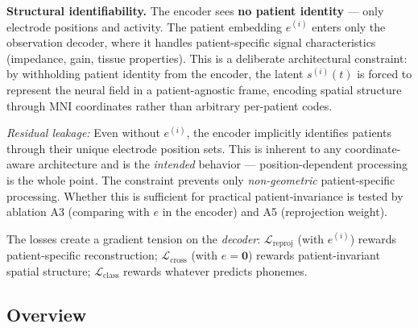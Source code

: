 \documentclass[11pt,letterpaper]{article}
\begin{document}
\textbf{Structural identifiability.} The encoder sees \textbf{no patient identity} --- only electrode positions and activity. The patient embedding $e^{(i)}$ enters only the observation decoder, where it handles patient-specific signal characteristics (impedance, gain, tissue properties). This is a deliberate architectural constraint: by withholding patient identity from the encoder, the latent $s^{(i)}(t)$ is forced to represent the neural field in a patient-agnostic frame, encoding spatial structure through MNI coordinates rather than arbitrary per-patient codes.

\textcolor{BrickRed}{\textit{Residual leakage:}} Even without $e^{(i)}$, the encoder implicitly identifies patients through their unique electrode position sets. This is inherent to any coordinate-aware architecture and is the \textit{intended} behavior --- position-dependent processing is the whole point. The constraint prevents only \textit{non-geometric} patient-specific processing. Whether this is sufficient for practical patient-invariance is tested by ablation A3 (comparing with $e$ in the encoder) and A5 (reprojection weight).

The losses create a gradient tension on the \textit{decoder}:
$\mathcal{L}_{\text{reproj}}$ (with $e^{(i)}$) rewards patient-specific reconstruction;
$\mathcal{L}_{\text{cross}}$ (with $e{=}\mathbf{0}$) rewards patient-invariant spatial structure;
$\mathcal{L}_{\text{class}}$ rewards whatever predicts phonemes.

\subsection{Overview}
\end{document}
